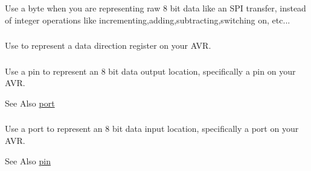 Use a byte when you are representing raw 8 bit data like an S\-P\-I transfer, instead of integer operations like incrementing,adding,subtracting,switching on, etc... 

\hypertarget{a00011_ae36b1ebcd4ca31bf51d6c3d39490e490}{
\subsubsection[{ddr}]{}}\label{a00011_ae36b1ebcd4ca31bf51d6c3d39490e490}


Use to represent a data direction register on your A\-V\-R. 

\hypertarget{a00011_aed45ca508d997dd992682abff8790bde}{
\subsubsection[{pin}]{}}\label{a00011_aed45ca508d997dd992682abff8790bde}


Use a pin to represent an 8 bit data output location, specifically a pin on your A\-V\-R. 

\begin{DoxySeeAlso}{See Also}
\hyperlink{a00011_af8fb0f45ee0195c7422a49e6a8d72369}{port} 
\end{DoxySeeAlso}
\hypertarget{a00011_af8fb0f45ee0195c7422a49e6a8d72369}{
\subsubsection[{port}]{}}\label{a00011_af8fb0f45ee0195c7422a49e6a8d72369}


Use a port to represent an 8 bit data input location, specifically a port on your A\-V\-R. 

\begin{DoxySeeAlso}{See Also}
\hyperlink{a00011_aed45ca508d997dd992682abff8790bde}{pin} 
\end{DoxySeeAlso}
\hypertarget{a00011_a69584ba90b098f23df3702374e594862}{
\subsubsection[{word}]{}}\label{a00011_a69584ba90b098f23df3702374e594862}


